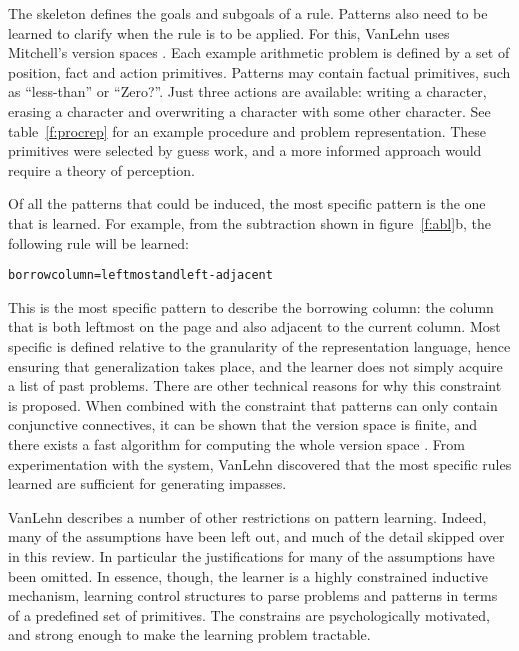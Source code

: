The skeleton defines the goals and subgoals of a rule.  Patterns also need
to be learned to clarify when the rule is to be applied.  For this, VanLehn
uses Mitchell's \citeyear{mitcvers} version spaces
\cite<see also>[chapter~2]{thortech}. Each example
arithmetic problem is defined by a set of position, fact and action
primitives. Patterns may contain factual primitives, such as ``less-than''
or ``Zero?''.  Just three actions are available: writing a character,
erasing a character and overwriting a character with some other character.
See table~\ref{f:procrep} for an example procedure and problem
representation.  These primitives were selected by guess work, and a more
informed approach would require a theory of perception.

Of all the patterns that could be induced, the most specific pattern is the
one that is learned. For example, from the
subtraction shown in figure~\ref{f:abl}b, the following rule will be
learned:
\begin{alltt}
 borrow column = leftmost and left-adjacent
\end{alltt}

\noindent This
is the most specific pattern to describe the borrowing column: the column
that is both leftmost on the page and also adjacent to the current column.
Most specific is defined relative to the granularity of the representation
language, hence ensuring that generalization takes place,
and the learner does not simply
acquire
a list of past problems. There are other technical reasons for why this
constraint is proposed.  When combined with the constraint that patterns
can only contain conjunctive connectives, it can be shown that the version
space is finite, and there exists a fast algorithm for computing the whole
version space \cite[p.~152]{mindbugs}.  From experimentation with the
system, VanLehn discovered that the most specific rules learned are
sufficient for generating impasses.

VanLehn
\citeyear[chapter~6]{mindbugs} describes a number of other restrictions on
pattern learning.
Indeed, many of the assumptions have been left out, and
much of the detail skipped over in this review.  In particular the
justifications
for many of the assumptions have been omitted.  In essence,
though, the learner is a highly constrained inductive mechanism, learning
control structures to parse problems and patterns in terms of a
predefined set of primitives.  The constrains are psychologically
motivated, and strong enough to make the learning problem tractable.


